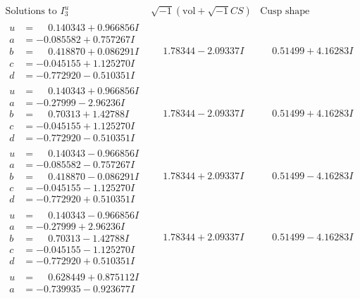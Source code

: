 \documentclass[1p]{elsarticle_modified}
\theoremstyle{definition}
\newcommand{\I}{\sqrt{-1}}
\begin{document}
$$\begin{array}{c|c|c}  
\text{Solutions to }I^u_{3}& \I (\text{vol} + \sqrt{-1}CS) & \text{Cusp shape}\\
 \hline 
\begin{aligned}
u &= \phantom{-}0.140343 + 0.966856 I \\
a &= -0.085582 + 0.757267 I \\
b &= \phantom{-}0.418870 + 0.086291 I \\
c &= -0.045155 + 1.125270 I \\
d &= -0.772920 - 0.510351 I\end{aligned}
 & \phantom{-}1.78344 - 2.09337 I & \phantom{-}0.51499 + 4.16283 I \\ \hline\begin{aligned}
u &= \phantom{-}0.140343 + 0.966856 I \\
a &= -0.27999 - 2.96236 I \\
b &= \phantom{-}0.70313 + 1.42788 I \\
c &= -0.045155 + 1.125270 I \\
d &= -0.772920 - 0.510351 I\end{aligned}
 & \phantom{-}1.78344 - 2.09337 I & \phantom{-}0.51499 + 4.16283 I \\ \hline\begin{aligned}
u &= \phantom{-}0.140343 - 0.966856 I \\
a &= -0.085582 - 0.757267 I \\
b &= \phantom{-}0.418870 - 0.086291 I \\
c &= -0.045155 - 1.125270 I \\
d &= -0.772920 + 0.510351 I\end{aligned}
 & \phantom{-}1.78344 + 2.09337 I & \phantom{-}0.51499 - 4.16283 I \\ \hline\begin{aligned}
u &= \phantom{-}0.140343 - 0.966856 I \\
a &= -0.27999 + 2.96236 I \\
b &= \phantom{-}0.70313 - 1.42788 I \\
c &= -0.045155 - 1.125270 I \\
d &= -0.772920 + 0.510351 I\end{aligned}
 & \phantom{-}1.78344 + 2.09337 I & \phantom{-}0.51499 - 4.16283 I \\ \hline\begin{aligned}
u &= \phantom{-}0.628449 + 0.875112 I \\
a &= -0.739935 - 0.923677 I \\

\end{aligned}
\end{array}$$
\end{document}

